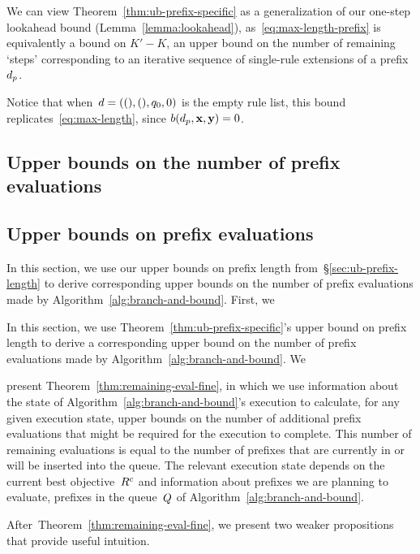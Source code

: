 We can view Theorem~\ref{thm:ub-prefix-specific} as a generalization
of our one-step lookahead bound (Lemma~\ref{lemma:lookahead}),
as~\eqref{eq:max-length-prefix} is equivalently a bound on ${K' - K}$,
an upper bound on the number of remaining `steps' corresponding to
an iterative sequence of single-rule extensions of a prefix~$d_p$.
%
\begin{arxiv}
Notice that when~${{d} = ((), (), q_0, 0)}$ is the empty rule list,
this bound replicates~\eqref{eq:max-length}, since ${b(d_p, \mathbf{x}, \mathbf{y}) = 0}$.
\end{arxiv}

\begin{arxiv}
\subsection{Upper bounds on the number of prefix evaluations}
\end{arxiv}
\begin{kdd}
\subsection{Upper bounds on prefix evaluations}
\end{kdd}
\label{sec:ub-size}

\begin{arxiv}
In this section, we use our upper bounds on prefix length
from~\S\ref{sec:ub-prefix-length} to derive corresponding
upper bounds on the number of prefix evaluations made by
Algorithm~\ref{alg:branch-and-bound}.
%
First, we
\end{arxiv}
\begin{kdd}
In this section, we use Theorem~\ref{thm:ub-prefix-specific}'s
upper bound on prefix length to derive a corresponding
upper bound on the number of prefix evaluations made by
Algorithm~\ref{alg:branch-and-bound}.
%
We
\end{kdd}
present Theorem~\ref{thm:remaining-eval-fine},
in which we use information about the state of
Algorithm~\ref{alg:branch-and-bound}'s execution
to calculate, for any given execution state,
upper bounds on the number of additional prefix evaluations that might
be required for the execution to complete.
%
This number of remaining evaluations is equal to the number of
prefixes that are currently in or will be inserted into the queue.
%
The relevant execution state depends on the current
best objective~${R^c}$ and information about
prefixes we are planning to evaluate, \ie prefixes in the
queue~$Q$ of Algorithm~\ref{alg:branch-and-bound}.
%
\begin{arxiv}
After~Theorem~\ref{thm:remaining-eval-fine}, we present two
weaker propositions that provide useful intuition.
\end{arxiv}

